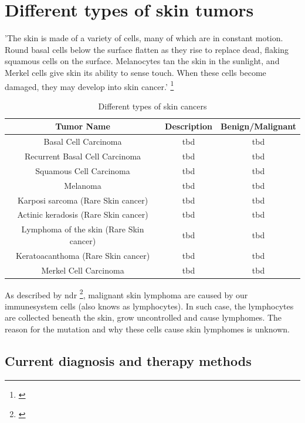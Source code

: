 \section{Different types of skin tumors}

'The skin is made of a variety of cells, many of which are in constant motion. Round basal cells below the surface flatten as they rise to replace dead, flaking squamous cells on the surface. Melanocytes tan the skin in the sunlight, and Merkel cells give skin its ability to sense touch. When these cells become damaged, they may develop into skin cancer.' \footnote{\cite{skin_cancer_types}} 

\begin{table}[h!]
\begin{center}
 \begin{tabular}{|| c | c | c ||} 
 \hline
Tumor Name & Description & Benign/Malignant \\ [0.5ex] 
\hline\hline
Basal Cell Carcinoma & tbd & tbd \\
\hline
Recurrent Basal Cell Carcinoma & tbd & tbd \\
 \hline
 Squamous Cell Carcinoma & tbd & tbd \\
 \hline
Melanoma & tbd & tbd \\
 \hline
 Karposi sarcoma (Rare Skin cancer) & tbd & tbd \\
 \hline
  Actinic keradosis (Rare Skin cancer) & tbd & tbd \\
\hline
Lymphoma of the skin (Rare Skin cancer) & tbd & tbd \\
\hline
 Keratoacanthoma (Rare Skin cancer) & tbd & tbd \\
\hline
 Merkel Cell Carcinoma & tbd & tbd \\
 \hline
\end{tabular}
\caption{Different types of skin cancers} \label{table}         

\end{center}
\end{table}




As described by \ac{ndr} \footnote{\cite{ndr_lymphom}}, malignant skin lymphoma are caused by our immunesystem cells (also knows as lymphocytes). In such case, the lymphocytes are collected beneath the skin, grow uncontrolled and cause lymphomes. The reason for the mutation and why these cells cause skin lymphomes is unknown.

\subsection{Current diagnosis and therapy methods}

